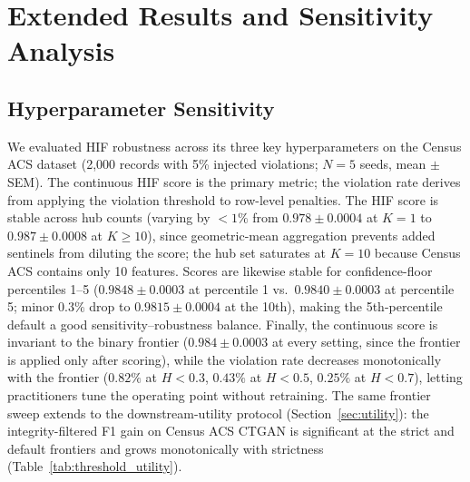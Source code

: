 \section{Extended Results and Sensitivity Analysis}

\subsection{Hyperparameter Sensitivity}\label{app:hyperparameters}

We evaluated HIF robustness across its three key hyperparameters on the Census ACS dataset (2,000 records with 5\% injected violations; $N=5$ seeds, mean $\pm$ SEM). The continuous HIF score is the primary metric; the violation rate derives from applying the violation threshold to row-level penalties. The HIF score is stable across hub counts (varying by $<1\%$ from $0.978 \pm 0.0004$ at $K=1$ to $0.987 \pm 0.0008$ at $K\geq 10$), since geometric-mean aggregation prevents added sentinels from diluting the score; the hub set saturates at $K=10$ because Census ACS contains only 10 features. Scores are likewise stable for confidence-floor percentiles 1--5 ($0.9848 \pm 0.0003$ at percentile 1 vs.\ $0.9840 \pm 0.0003$ at percentile 5; minor $0.3\%$ drop to $0.9815 \pm 0.0004$ at the 10th), making the 5th-percentile default a good sensitivity--robustness balance. Finally, the continuous score is invariant to the binary frontier ($0.984 \pm 0.0003$ at every setting, since the frontier is applied only after scoring), while the violation rate decreases monotonically with the frontier ($0.82\%$ at $H < 0.3$, $0.43\%$ at $H < 0.5$, $0.25\%$ at $H < 0.7$), letting practitioners tune the operating point without retraining. The same frontier sweep extends to the downstream-utility protocol (Section~\ref{sec:utility}): the integrity-filtered F1 gain on Census ACS CTGAN is significant at the strict and default frontiers and grows monotonically with strictness (Table~\ref{tab:threshold_utility}).

